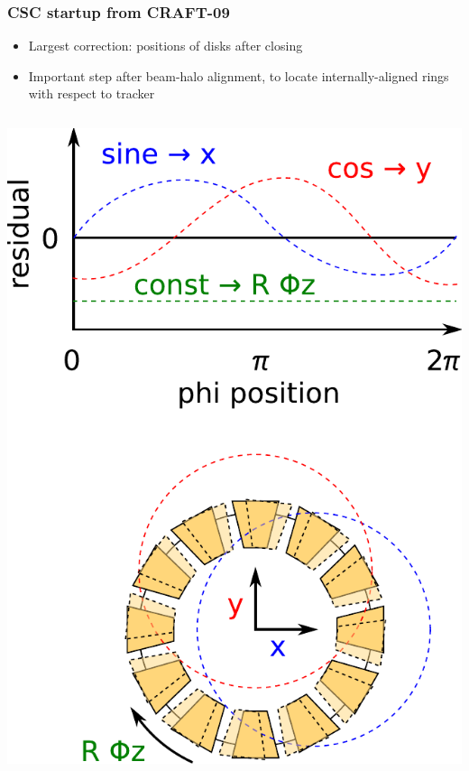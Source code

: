 \documentclass[compress]{beamer}
\begin{document}
\begin{frame}
\frametitle{CSC startup from CRAFT-09}

\begin{itemize}
\item Largest correction: positions of disks after closing
\item Important step after beam-halo alignment, to locate internally-aligned rings with respect to tracker
\end{itemize}

\begin{columns}
\includegraphics[width=\linewidth]{tracker_disk_interpretation.pdf}


\end{columns}
\end{frame}
\end{document}
